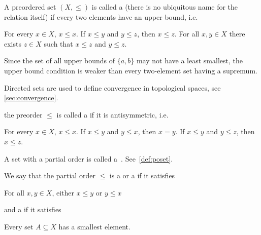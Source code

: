 \begin{definition}
\begin{defenum}
    \item\label{def:order/directed}\cite[8]{Engelking1989} A preordered set \( (X, \leq) \) is called a  (there is no ubiquitous name for the relation itself) if every two elements have an upper bound, i.e.
    \begin{description}
       For every \( x \in X \), \( x \leq x \).
       If \( x \leq y \) and \( y \leq z \), then \( x \leq z \).
       For all \( x, y \in X \) there exists \( z \in X \) such that \( x \leq z \) and \( y \leq z \).
    \end{description}

    Since the set of all upper bounds of \( \{ a, b \} \) may not have a least smallest, the upper bound condition is weaker than every two-element set having a supremum.

    Directed sets are used to define convergence in topological spaces, see \cref{sec:convergence}.

    \item\label{def:order/partial}\cite[7]{Engelking1989} the preorder \( \leq \) is called a  if it is antisymmetric, i.e.
    \begin{description}
       For every \( x \in X \), \( x \leq x \).
       If \( x \leq y \) and \( y \leq x \), then \( x = y \).
       If \( x \leq y \) and \( y \leq z \), then \( x \leq z \).
    \end{description}

    A set with a partial order is called a~. See~\cref{def:poset}.

    We say that the partial order \( \leq \) is a  or a  if it satisfies
    \begin{description}
       For all \( x, y \in X \), either \( x \leq y \) or \( y \leq x \)
    \end{description}
    and a  if it satisfies
    \begin{description}
       Every set \( A \subseteq X \) has a smallest element.
    \end{description}


\end{defenum}
\end{definition}
